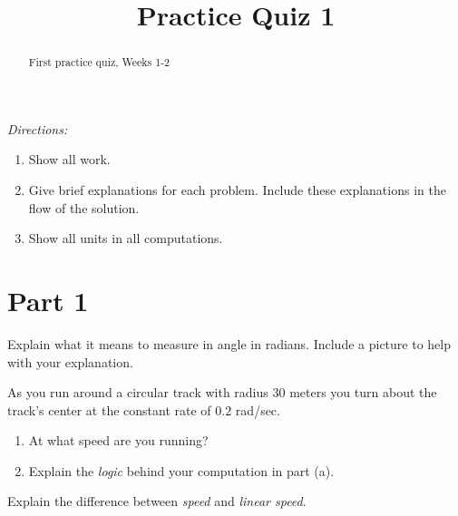 \documentclass{ximera}
\title{Practice Quiz 1}
\begin{document}
\begin{abstract}
First practice quiz, Weeks 1-2
\end{abstract}
\maketitle

\emph{Directions:}

\begin{enumerate}
\item Show all work.

\item Give brief explanations for each problem. Include these explanations in the flow of the solution.

\item Show all units in all computations.
\end{enumerate}


\section{Part 1}

\begin{question}  \label{Qdgfg4thhnn}
Explain what it means to measure in angle in radians. Include a picture to help with your explanation.
\end{question}

\begin{question}  \label{Q5543hghhjmmm}
 As you run around a circular track with radius $30$ meters you turn about the track's center at the constant rate of $0.2$ rad/sec.

\begin{enumerate}
\item At what speed are you running?

\item Explain the \emph{logic} behind your computation in part (a).

\end{enumerate}
\end{question}


\begin{question}  \label{Qcvfg44f}
Explain the difference between \emph{speed} and \emph{linear speed}.
\end{question}
\end{document}

